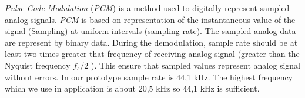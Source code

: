 \documentclass[11pt,titlepage]{article}
\theoremstyle{plain}
\begin{document}
\textit{Pulse-Code Modulation} (\textit{PCM}) is a method used to digitally represent sampled analog signals. \textit{PCM} is based on representation of the instantaneous value of the signal (Sampling) at uniform intervals (sampling rate). The sampled analog data are represent by binary data. During the demodulation, sample rate should be at least two times greater that frequency of receiving analog signal (greater than the Nyquist frequency $f_s / 2$ ). This ensure that sampled values represent analog signal without errors. In our prototype sample rate is 44,1 kHz. The highest frequency which we use in application is about 20,5 kHz so 44,1 kHz is sufficient. 

\end{document}
